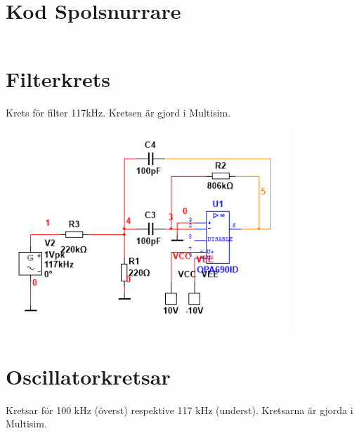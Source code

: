 \documentclass[a4paper]{article}
\begin{document}
\begin{sloppypar}
    \newpage
    \appendices
    \titleformat{\section}[display]
    {\normalfont\Large\bfseries}{\appendixname\enspace\thesection}{.5em}{} %



    \section{Kod Spolsnurrare}
    \label{bilaga:Kod_Spolsnurrare}
    \inputminted[breaklines]{cpp}{./Code/Spolsnurrare.cpp}

    \newpage
    \section{Filterkrets}
    \label{bilaga:Kretsschema-filter}
    \begin{FlushLeft}
        Krets för filter 117kHz. Kretsen är gjord i Multisim.
    \end{FlushLeft}
    \includegraphics[width = 0.8\textwidth]{filter117kHz-circuit.png}

    \newpage
    \section{Oscillatorkretsar}
    \begin{FlushLeft}
        Kretsar för 100 kHz (överst) respektive 117 kHz (underst). Kretsarna är gjorda i Multisim.
    \end{FlushLeft}



\end{sloppypar}
\end{document}
